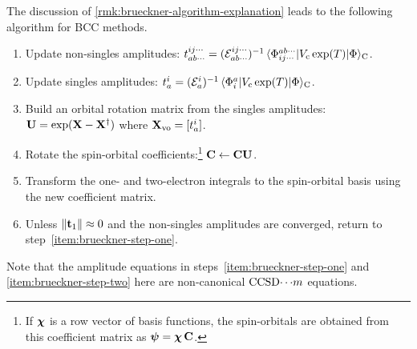 \documentclass[11pt]{article}
\numberwithin{equation}{section}
\begin{document}
\begin{rmk}
The discussion of \cref{rmk:brueckner-algorithm-explanation} leads to the following algorithm for BCC methods.
\begin{enumerate}
\item
\label{item:brueckner-step-one}
Update non-singles amplitudes:
$
  t_{ab\cdots}^{ij\cdots}
=
  (\mathcal{E}_{ab\cdots}^{ij\cdots})^{-1}\,
  \langle\Phi _{ij\cdots}^{ab\cdots}|
    V_{\mathrm{c}}\,
    \mathrm{exp}(T)
  |\Phi \rangle_{\mathrm{C}}
$.

\item
\label{item:brueckner-step-two}
Update singles amplitudes:
$
  t_a^i
=
  (\mathcal{E}_a^i)^{-1}\,
  \langle\Phi _i^a|
    V_{\mathrm{c}}\,
    \mathrm{exp}(T)
  |\Phi \rangle_{\mathrm{C}}
$.

\item
Build an orbital rotation matrix from the singles amplitudes:
$
  \mathbf{U}
=
  \mathrm{exp}(\mathbf{X} - \mathbf{X}^\dagger)
$
where
$
  \mathbf{X}_{\mathrm{vo}}
=
  [t_a^i]
$.

\item
Rotate the spin-orbital coefficients:\footnote{
  If $\bm{\x}$ is a row vector of basis functions, the spin-orbitals are obtained from this coefficient matrix as
  $\bm{\y}=\bm{\x}\,\bo{C}$.
}
$
  \mathbf{C}
\leftarrow
  \mathbf{C}\mathbf{U}
$.

\item
Transform the one- and two-electron integrals to the spin-orbital basis using the new coefficient matrix.

\item
Unless $\|\mathbf{t}_1\|\approx0$ and the non-singles amplitudes are converged, return to step~\ref{item:brueckner-step-one}.
\end{enumerate}
Note that the amplitude equations in steps~\ref{item:brueckner-step-one} and \ref{item:brueckner-step-two} here are non-canonical $\mathrm{CCSD}{\cdots}m$ equations.
\end{rmk}
\end{document}
